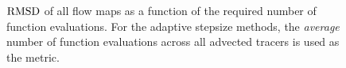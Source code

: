 \begin{figure}[htpb]
    \centering
    
    \caption[$\rmsd$ of all flow maps as a function of the required number of
    function evaluations]{$\rmsd$ of all flow maps as a function of the required number of
    function evaluations. For the adaptive stepsize methods, the \emph{average}
    number of function evaluations across all advected tracers is used as the
    metric.}
    \label{fig:flowmap_err_both}
\end{figure}
